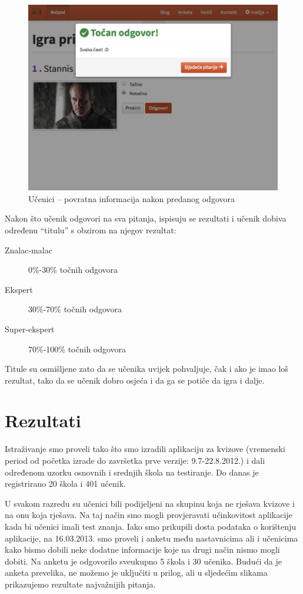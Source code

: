 \documentclass[11pt]{scrreprt}
\begin{document}
\begin{figure}[H]
  \includegraphics[width=\textwidth, clip=true, trim=0 7cm 0 0, fbox]{student/boolean_question_correct}
  \caption{Učenici -- povratna informacija nakon predanog odgovora}
\end{figure}

Nakon što učenik odgovori na sva pitanja, ispisuju se rezultati i učenik dobiva
određenu ``titulu'' s obzirom na njegov rezultat:

\begin{description}
  \item[Znalac-malac] 0\%-30\% točnih odgovora
  \item[Ekspert] 30\%-70\% točnih odgovora
  \item[Super-ekspert] 70\%-100\% točnih odgovora
\end{description}

Titule su osmišljene zato da se učenika uvijek pohvaljuje, čak i ako je imao loš
rezultat, tako da se učenik dobro osjeća i da ga se potiče da igra i dalje.

\chapter{Rezultati}
\label{chap:results}

Istraživanje smo proveli tako što smo izradili aplikaciju za kvizove (vremenski
period od početka izrade do završetka prve verzije: 9.7-22.8.2012.) i dali
određenom uzorku osnovnih i srednjih škola na testiranje. Do danas je
registrirano 20 škola i 401 učenik.

U svakom razredu su učenici bili podijeljeni na skupinu koja ne rješava kvizove
i na onu koja rješava. Na taj način smo mogli provjeravati učinkovitost
aplikacije kada bi učenici imali test znanja. Iako smo prikupili dosta podataka
o korištenju aplikacije, na 16.03.2013. smo proveli i anketu među nastavnicima
ali i učenicima kako bismo dobili neke dodatne informacije koje na drugi način
nismo mogli dobiti. Na anketu je odgovorilo sveukupno 5 škola i 30 učenika.
Budući da je anketa prevelika, ne možemo je uključiti u prilog, ali u sljedećim
slikama prikazujemo rezultate najvažnijih pitanja.
\end{document}
